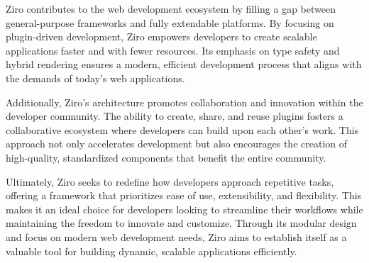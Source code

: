 Ziro contributes to the web development ecosystem by filling a gap between general-purpose frameworks and fully extendable platforms. By focusing on plugin-driven development, Ziro empowers developers to create scalable applications faster and with fewer resources. Its emphasis on type safety and hybrid rendering ensures a modern, efficient development process that aligns with the demands of today’s web applications.

Additionally, Ziro’s architecture promotes collaboration and innovation within the developer community. The ability to create, share, and reuse plugins fosters a collaborative ecosystem where developers can build upon each other’s work. This approach not only accelerates development but also encourages the creation of high-quality, standardized components that benefit the entire community.

Ultimately, Ziro seeks to redefine how developers approach repetitive tasks, offering a framework that prioritizes ease of use, extensibility, and flexibility. This makes it an ideal choice for developers looking to streamline their workflows while maintaining the freedom to innovate and customize. Through its modular design and focus on modern web development needs, Ziro aims to establish itself as a valuable tool for building dynamic, scalable applications efficiently.



\pagebreak
